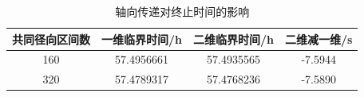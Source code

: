 \begin{table}[H]
    \centering
    \small
    \caption{轴向传递对终止时间的影响}
    \label{tab:q3-axial-time}

    \renewcommand{\arraystretch}{1.35}
    \begin{tabular}{cccc}
        \toprule
        共同径向区间数
        & 一维临界时间/h
        & 二维临界时间/h
        & 二维减一维/s \\
        \midrule
        160
        & 57.4956661
        & 57.4935565
        & -7.5944 \\
        320
        & 57.4789317
        & 57.4768236
        & -7.5890 \\
        \bottomrule
    \end{tabular}
\end{table}